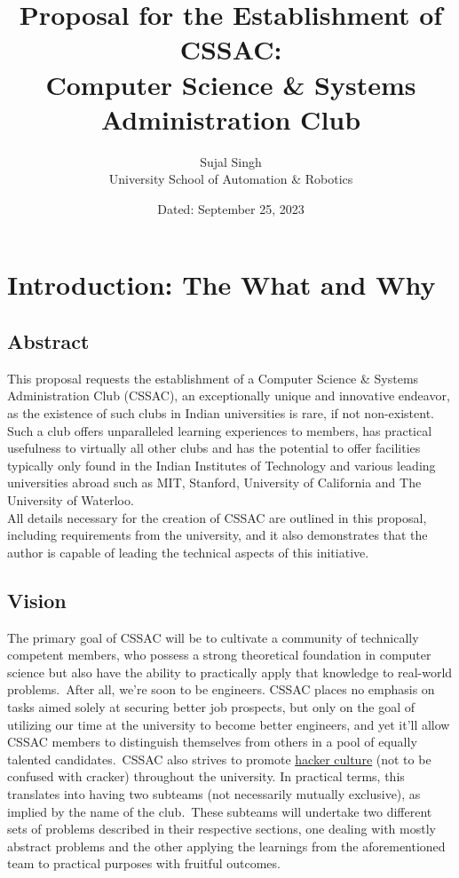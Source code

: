 \documentclass[11pt,twocolumn,oneside]{book}
\title{\textbf{Proposal for the Establishment of CSSAC: \\ Computer Science \& Systems Administration Club}}
\author{Sujal Singh \\ University School of Automation \& Robotics}
\date{Dated: September 25, 2023}
\begin{document}
    \maketitle
    \tableofcontents


    \chapter{Introduction: The What and Why}\label{ch:introduction}


    \section{Abstract}\label{sec:abstract}
    This proposal requests the establishment of a Computer Science \& Systems Administration Club (CSSAC), an
    exceptionally unique and innovative endeavor, as the existence of such clubs in Indian universities is rare, if not
    non-existent.
    Such a club offers unparalleled learning experiences to members, has practical usefulness to virtually all other
    clubs and has the potential to offer facilities typically only found in the Indian Institutes of Technology and
    various leading universities abroad such as MIT, Stanford, University of California and The University of Waterloo.
    \\
    All details necessary for the creation of CSSAC are outlined in this proposal, including requirements from the
    university, and it also demonstrates that the author is capable of leading the technical aspects of this initiative.


    \section{Vision}\label{sec:vision}
    The primary goal of CSSAC will be to cultivate a community of technically competent members, who possess a strong
    theoretical foundation in computer science but also have the ability to practically apply that knowledge to
    real-world problems.\ After all, we're soon to be engineers.
    CSSAC places no emphasis on tasks aimed solely at securing better job prospects, but only on the goal of
    utilizing our time at the university to become better engineers, and yet it'll allow CSSAC members to distinguish
    themselves from others in a pool of equally talented candidates.\ CSSAC also strives to promote
    \href{https://wikipedia.org/wiki/Hacker_culture}{\color{blue}\underline{hacker culture}} (not to be confused with
    cracker) throughout the university.
    In practical terms, this translates into having two subteams (not necessarily mutually exclusive), as implied by the
    name of the club.\ These subteams will undertake two different sets of problems described in their respective
    sections, one dealing with mostly abstract problems and the other applying the learnings from the aforementioned
    team to practical purposes with fruitful outcomes.
\end{document}
